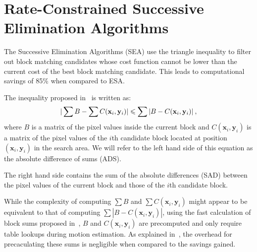 \documentclass{article}
\newcommand{\beq}{\begin{dmath}}
\newcommand{\eeq}{\end{dmath}}
\newcommand{\vx}{\mathbf{x}}
\newcommand{\vy}{\mathbf{y}}
\begin{document}
\vspace{-2mm}
\section{Rate-Constrained Successive Elimination Algorithms}
\label{sec:rdsea}
\vspace{-1mm}
The Successive Elimination Algorithms (SEA) use the triangle inequality to filter out block matching candidates whose cost function cannot be lower than the current cost of the best block matching candidate. This leads to computational savings of 85\% when compared to ESA\cite{Li1995}.

The inequality proposed in~\cite{Li1995} is written as:
\beq
\small
| \sum{B} - \sum{C(\vx_i,\vy_i)} | \leqslant \sum{|B - C(\vx_i,\vy_i)|} \:,
\label{eq:SEA}
\eeq 
where $B$ is a matrix of the pixel values inside the current block and $C(\vx_i,\vy_i)$ is a matrix of the pixel values of the $i$th candidate block located at position $(\vx_i,\vy_i)$ in the search area. We will refer to the left hand side of this equation as the absolute difference of sums (ADS). 

The right hand side contains the sum of the absolute differences (SAD) between the pixel values of the current block and those of the $i$th candidate block.

While the complexity of computing $\sum{B}$ and $\sum{C(\vx_i,\vy_i)}$ might appear to be equivalent to that of computing $\sum{|B - C(\vx_i,\vy_i)|}$, using the fast calculation of block sums proposed in~\cite{Li1995}, $B$ and $C(\vx_i,\vy_i)$ are precomputed and only require table lookups during motion estimation. As explained in~\cite{Li1995}, the overhead for precaculating these sums is negligible when compared to the savings gained.
\end{document}
